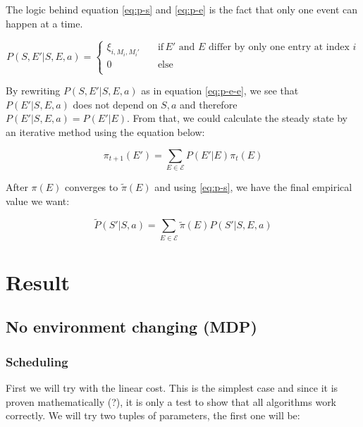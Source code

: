 \documentclass[
  a4paper, xcolor = usenames,dvipsnames]{article}
\theoremstyle{definition}
\theoremstyle{definition}
\theoremstyle{definition}
\theoremstyle{definition}
\theoremstyle{remark}
\begin{document}
The logic behind equation \eqref{eq:p-s} and \eqref{eq:p-e} is the fact that only one event can happen at a time.

\begin{equation}
  P(S, E'|S, E, a) = 
    \begin{cases}
        \xi_{i, M_{i}, M_{i}'} \quad & \text{if} \, E' \text{ and } E \text{ differ by only one entry at index } i \\
        0 \quad & \text{else} \\
    \end{cases}
\label{eq:p-e-e}
\end{equation}

By rewriting \(P(S, E' | S, E, a)\) as in equation \eqref{eq:p-e-e}, we see that \(P(E'|S, E, a)\) does not depend on \(S, a\) and therefore \(P(E'|S, E, a) = P(E'| E)\). From that, we could calculate the steady state by an iterative method using the equation below:

\begin{equation}
\label{eq:steady-prob}
    \pi_{t + 1}(E') = \sum_{E \in \mathcal{E}} P(E'| E) \pi_{t}(E)
\end{equation}

After \(\pi(E)\) converges to \(\tilde{\pi}(E)\) and using \eqref{eq:p-s}, we have the final empirical value we want:

\begin{equation}
\label{eq:p-tilde}
    \tilde{P}(S'| S, a) = \sum_{E \in \mathcal{E}} \tilde{\pi}(E) P(S'| S, E, a)
\end{equation}

\hypertarget{result}{%
\section{Result}\label{result}}

\hypertarget{no-environment-changing-mdp}{%
\subsection{No environment changing (MDP)}\label{no-environment-changing-mdp}}

\hypertarget{scheduling}{%
\subsubsection{Scheduling}\label{scheduling}}

First we will try with the linear cost. This is the simplest case and since it is proven mathematically (?), it is only a test to show that all algorithms work correctly. We will try two tuples of parameters, the first one will be:
\end{document}
